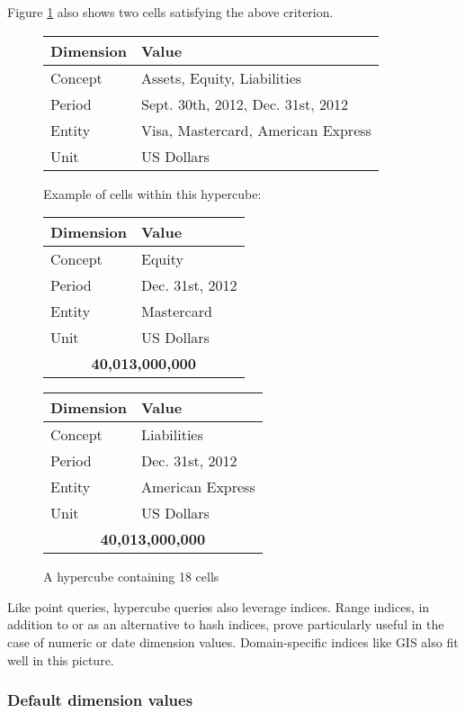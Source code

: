 \documentclass{vldb}
\begin{document}
Figure \ref{fig-hypercube} also shows two cells satisfying the above criterion.

\begin{figure}
\caption{A hypercube containing 18 cells}
\label{fig-hypercube}
\begin{tabular}{|l|l|}
\hline
Dimension & Value \\
\hline
Concept & Assets, Equity, Liabilities \\
Period & Sept. 30th, 2012, Dec. 31st, 2012 \\
Entity & Visa, Mastercard, American Express \\
Unit & US Dollars \\
\hline
\end{tabular}

Example of cells within this hypercube:

\begin{tabular}{|l|l|}
\hline
Dimension & Value \\
\hline
Concept & Equity \\
Period & Dec. 31st, 2012 \\
Entity & Mastercard \\
Unit & US Dollars \\
\hline
\multicolumn{2}{|c|}{\textbf{40,013,000,000}} \\
\hline
\end{tabular}
\begin{tabular}{|l|l|}
\hline
Dimension & Value \\
\hline
Concept & Liabilities \\
Period & Dec. 31st, 2012 \\
Entity & American Express \\
Unit & US Dollars \\
\hline
\multicolumn{2}{|c|}{\textbf{40,013,000,000}} \\
\hline
\end{tabular}
\end{figure}

Like point queries, hypercube queries also leverage indices. Range indices, in addition to or as an alternative to hash indices, prove particularly useful in the case of numeric or date dimension values. Domain-specific indices like GIS also fit well in this picture.

\subsubsection{Default dimension values}
\end{document}
